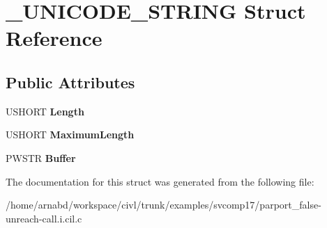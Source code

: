 \hypertarget{struct__UNICODE__STRING}{}\section{\+\_\+\+U\+N\+I\+C\+O\+D\+E\+\_\+\+S\+T\+R\+I\+N\+G Struct Reference}
\label{struct__UNICODE__STRING}
\subsection*{Public Attributes}
\begin{DoxyCompactItemize}
\item 
\hypertarget{struct__UNICODE__STRING_a3ebb6a85103954fd7fc325ba30c54008}{}U\+S\+H\+O\+R\+T {\bfseries Length}\label{struct__UNICODE__STRING_a3ebb6a85103954fd7fc325ba30c54008}

\item 
\hypertarget{struct__UNICODE__STRING_ae0487ecc173e55918bcee834bd3d107b}{}U\+S\+H\+O\+R\+T {\bfseries Maximum\+Length}\label{struct__UNICODE__STRING_ae0487ecc173e55918bcee834bd3d107b}

\item 
\hypertarget{struct__UNICODE__STRING_afbc2ba2b7be88d0118e683a2eb289795}{}P\+W\+S\+T\+R {\bfseries Buffer}\label{struct__UNICODE__STRING_afbc2ba2b7be88d0118e683a2eb289795}

\end{DoxyCompactItemize}


The documentation for this struct was generated from the following file\+:\begin{DoxyCompactItemize}
\item 
/home/arnabd/workspace/civl/trunk/examples/svcomp17/parport\+\_\+false-\/unreach-\/call.\+i.\+cil.\+c\end{DoxyCompactItemize}
